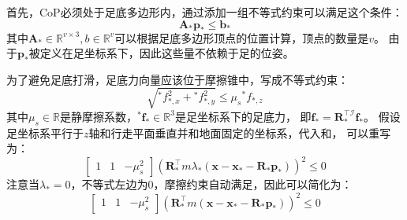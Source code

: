 首先，CoP必须处于足底多边形内，通过添加一组不等式约束可以满足这个条件：
\begin{equation}
    \label{equ:inequ_constraint}
    \boldsymbol{A}_* \boldsymbol{p}_* \leq \boldsymbol{b}_*
\end{equation}
其中$\boldsymbol{A}_* \in \mathbb{R}^{v \times 3}, b \in \mathbb{R}^{v}$可以根据足底多边形顶点的位置计算，顶点的数量是$v$。
由于$\boldsymbol{p}_*$被定义在足坐标系下，因此这些量不依赖于足的位姿。

为了避免足底打滑，足底力向量应该位于摩擦锥中，写成不等式约束：
\begin{equation}
    \label{equ:friction}
    \sqrt{{ }^* f_{*, x}^2+{ }^* f_{*, y}^2} \leq \mu_s{ }^* f_{*, z}
\end{equation}
其中$\mu_s \in \mathbb{R}$是静摩擦系数，${ }^* \boldsymbol{f}_* \in \mathbb{R}^{3}$是足坐标系下的足底力，
即$\boldsymbol{f}_*=\boldsymbol{R}_*^{\top \mathcal{I}} \boldsymbol{f}_*$。
假设足坐标系平行于$z$轴和行走平面垂直并和地面固定的坐标系，代入和，
可以重写为：
\begin{equation}
    \label{equ:friction_2}
    \left[\begin{array}{lll}
        1 & 1 & -\mu_s^2
        \end{array}\right]\left(\boldsymbol{R}_*^{\top} m \lambda_*\left(\boldsymbol{x}-\boldsymbol{x}_*-\boldsymbol{R}_* \boldsymbol{p}_*\right)\right)^2 \leq 0
\end{equation}
注意当$\lambda_*=0$，不等式左边为0，摩擦约束自动满足，因此可以简化为：
\begin{equation}
    \label{equ:friction_simplify}
    \left[\begin{array}{lll}
        1 & 1 & -\mu_s^2
        \end{array}\right]\left(\boldsymbol{R}_*^{\top} m \left(\boldsymbol{x}-\boldsymbol{x}_*-\boldsymbol{R}_* \boldsymbol{p}_*\right)\right)^2 \leq 0
\end{equation}


